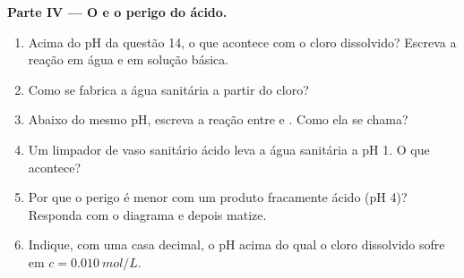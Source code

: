 \begin{problem}
\medskip
\noindent\textbf{Parte IV --- O  e o perigo do ácido.}
\begin{enumerate}[resume]
  \item Acima do pH da questão 14, o que acontece com o cloro dissolvido?
        Escreva a reação em água e em solução básica.
  \item Como se fabrica a água sanitária a partir do cloro?
  \item Abaixo do mesmo pH, escreva a reação entre  e .
        Como ela se chama?
  \item Um limpador de vaso sanitário ácido leva a água sanitária a pH 1.
        O que acontece?
  \item Por que o perigo é menor com um produto fracamente ácido
        (pH 4)? Responda com o diagrama e depois matize.
  \item Indique, com uma casa decimal, o pH acima do qual o cloro
        dissolvido sofre  em $c = \qty{0.010}{mol/L}$.
\end{enumerate}
\end{problem}
